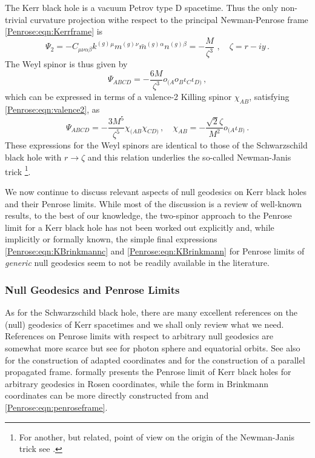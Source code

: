 The Kerr black hole is a vacuum Petrov type D spacetime. Thus the only non-trivial curvature projection withe respect to the principal Newman-Penrose frame \eqref{Penrose:eqn:Kerrframe} is
\begin{equation}\label{Penrose:eqn:KPsi2}
\Psi_2 = -C_{\mu \nu \alpha \beta} k^{(g)}{}^{\mu} m^{(g)}{}^{\nu}\bar{m}^{(g)}{}^{\alpha} n^{(g)}{}^{\beta}= -\frac{M}{\zeta^3} \, \, , \quad \zeta = r - i y \, .
\end{equation}
The Weyl spinor is thus given by
\begin{equation}
\Psi_{ABCD} = -\frac{6 M}{\zeta^3} o_{(A} o_B \iota_C \iota_{D)} \, ,
\end{equation}
which can be expressed in terms of a valence-2 Killing spinor $\chi_{AB}$, satisfying \eqref{Penrose:eqn:valence2}, as
\begin{equation}\label{Penrose:eqn:KPsiABCD}
\Psi_{ABCD} = -\frac{3 M^5}{\zeta^5}\chi_{(AB}\chi_{CD)} \, , \quad \chi_{AB} =  -\frac{\sqrt{2}\zeta}{M^2} o_{(A} \iota_{B)}  \, .
\end{equation}
These expressions for the Weyl spinors are identical to those of the Schwarzschild black hole with $r \to \zeta$
and this relation underlies the so-called Newman-Janis trick \cite{Newman:1965tw}\footnote{For another, but
related, point of view on the origin of the Newman-Janis trick see \cite{Arkani-Hamed:2019ymq,Guevara:2020xjx}.}. 

We now continue to discuss relevant aspects of null geodesics on Kerr black holes and their Penrose limits. While most of the discussion is a review of well-known results, to the best of our knowledge, the two-spinor approach to the Penrose limit for a Kerr black hole has not been worked out explicitly and, while implicitly or formally known, the simple final expressions \eqref{Penrose:eqn:KBrinkmannc} and \eqref{Penrose:eqn:KBrinkmann} for Penrose limits of \emph{generic} null geodesics seem to not be readily available in the literature.

\subsubsection{Null Geodesics and Penrose Limits}

As for the Schwarzschild black hole, there are many excellent references on the (null) geodesics of  Kerr spacetimes \cite{Carter:1968rr,Bardeen:1973tla,Chandrasekhar:1985kt,Gralla:2019ceu,Compere:2021bkk,Cieslik:2023qdc} and we shall only review what we need. References on Penrose limits with respect to arbitrary null geodesics are somewhat more scarce but see \cite{Igata:2019pgb,Fransen:2023eqj,Hollowood:2009qz} for photon sphere and equatorial orbits. See also \cite{Papadopoulos:2020qik} for the construction of adapted coordinates and \cite{Kubiznak:2008zs} for the construction of a parallel propagated frame. \cite{Papadopoulos:2020qik} formally presents the Penrose limit of Kerr black holes for arbitrary geodesics in Rosen coordinates, while the form in Brinkmann coordinates can be more directly constructed from \cite{Kubiznak:2008zs} and \eqref{Penrose:eqn:penroseframe}. 

